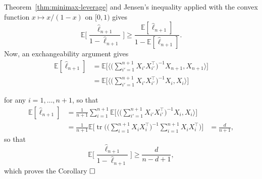 \documentclass[
	fontsize=11pt, %
	twoside=false, %
	numbers=noenddot, %
]{kaobook}
\DeclareMathOperator{\tr}{tr}
\newcommand{\E}{\mathbb E}
\newcommand{\wh}{\widehat}
\begin{document}
Theorem~\ref{thm:minimax-leverage} and Jensen's inequality applied with the convex function $x \mapsto x / (1-x)$ on $[0, 1)$ gives
\begin{equation*}
	\E \Big[ \frac{\wh \ell_{n+1}}{1 - \wh \ell_{n+1}} \Big] \geq \frac{\E[\wh \ell_{n+1}]}{1 - \E[\wh \ell_{n+1}]}.
\end{equation*}
Now, an exchangeability%
argument gives
\begin{align*}
	\E [\wh \ell_{n + 1}] &= \E \bigg[ \Big \langle \Big( \sum_{i'=1}^{n+1} X_{i'} X_{i'}^\top 
	\Big)^{-1} X_{n+1}, X_{n+1} \Big \rangle \bigg] \\
	&= \E \bigg[ \Big \langle \Big( \sum_{i'=1}^{n+1} X_{i'} X_{i'}^\top \Big)^{-1} X_{i}, X_{i} 
	\Big \rangle \bigg]
\end{align*}

for any $i=1, \ldots, n+1$, so that
\begin{align*}
 	\E [\wh \ell_{n + 1}] &= \frac{1}{n+1} \sum_{i=1}^{n+1} \E \bigg[ \Big \langle \Big( \sum_{i'=1}^{n+1} X_{i'} X_{i'}^\top \Big)^{-1} X_{i}, X_{i} \Big \rangle \bigg] \\
 	&= \frac{1}{n+1}  \E \bigg [ \tr \bigg( \Big( \sum_{i=1}^{n+1} X_i X_i^\top \Big)^{-1} \sum_{i=1}^{n+1} X_i X_i^\top \bigg) \bigg] 
 	&= \frac{d}{n + 1},
 \end{align*}
so that
\begin{equation*}
	\E \Big[ \frac{\wh \ell_{n+1}}{1 - \wh \ell_{n+1}} \Big] \geq \frac{d}{n - d + 1},
\end{equation*}
which proves the Corollary $\hfill \square$










\printbibliography[heading=bibintoc, title=Bibliography] %
\end{document}
